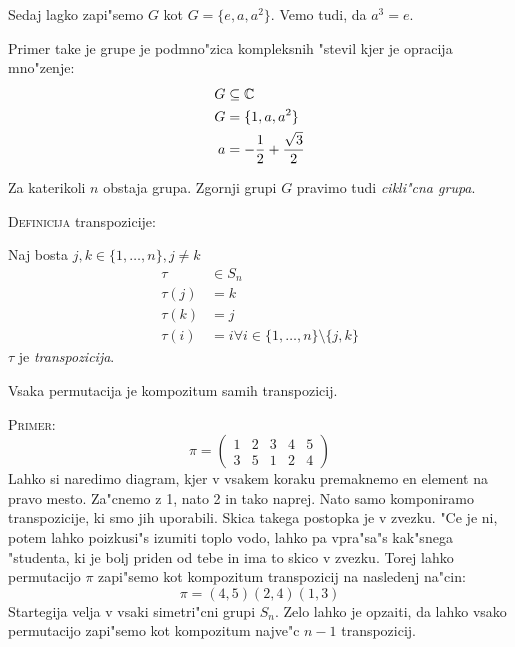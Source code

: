 Sedaj lagko zapi"semo $G$ kot $G = \{e, a, a^2\}$. Vemo tudi, da $a^3 = e$.

Primer take je grupe je podmno"zica kompleksnih "stevil kjer je opracija mno"zenje:
\begin{align*}
G &\subseteq \mathbb{C}\\
G &= \{1, a, a^2\}\\
a &= -\dfrac{1}{2} + \dfrac{\sqrt{3}}{2}
\end{align*}

Za katerikoli $n$ obstaja grupa. Zgornji grupi $G$ pravimo tudi \emph{cikli"cna grupa}.

\textsc{Definicija} transpozicije:

Naj bosta $j, k \in \{1, \ldots, n\}, j \neq k$
\begin{align*}
	\tau &\in S_n \\
	\tau(j) &= k \\
	\tau(k) &= j \\
	\tau(i) &= i \forall i \in \{1, \ldots, n \} \setminus \{j, k\}
\end{align*}
$\tau$ je \emph{transpozicija}.

Vsaka permutacija je kompozitum samih transpozicij.

\textsc{Primer:}
\begin{equation*}
\pi = \begin{pmatrix}
1 & 2 & 3 & 4 & 5 \\
3 & 5 & 1 & 2 & 4
\end{pmatrix}
\end{equation*}
Lahko si naredimo diagram, kjer v vsakem koraku premaknemo en element na pravo mesto. Za"cnemo z 1, nato 2 in tako naprej. Nato samo komponiramo transpozicije, ki smo jih uporabili. Skica takega postopka je v zvezku. "Ce je ni, potem lahko poizkusi"s izumiti toplo vodo, lahko pa vpra"sa"s kak"snega "studenta, ki je bolj priden od tebe in ima to skico v zvezku. Torej lahko permutacijo $\pi$ zapi"semo kot kompozitum transpozicij na nasledenj na"cin:
\begin{equation*}
\pi = (4, 5) (2, 4) (1, 3)
\end{equation*}
Startegija velja v vsaki simetri"cni grupi $S_n$. Zelo lahko je opzaiti, da lahko vsako permutacijo zapi"semo kot kompozitum najve"c $n-1$ transpozicij.

